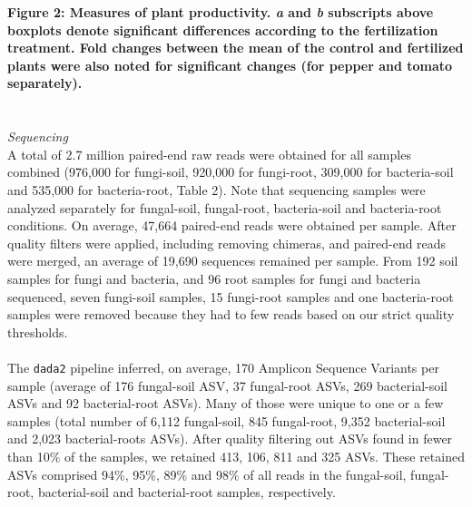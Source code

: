\documentclass[11pt,]{article}
\begin{document}
\textbf{Figure 2: Measures of plant productivity. \emph{a} and \emph{b}
subscripts above boxplots denote significant differences according to
the fertilization treatment. Fold changes between the mean of the
control and fertilized plants were also noted for significant changes
(for pepper and tomato separately).}\\
\hspace*{0.333em}\\
\hspace*{0.333em}\\
\emph{Sequencing}\\
A total of 2.7 million paired-end raw reads were obtained for all
samples combined (976,000 for fungi-soil, 920,000 for fungi-root,
309,000 for bacteria-soil and 535,000 for bacteria-root, Table 2). Note
that sequencing samples were analyzed separately for fungal-soil,
fungal-root, bacteria-soil and bacteria-root conditions. On average,
47,664 paired-end reads were obtained per sample. After quality filters
were applied, including removing chimeras, and paired-end reads were
merged, an average of 19,690 sequences remained per sample. From 192
soil samples for fungi and bacteria, and 96 root samples for fungi and
bacteria sequenced, seven fungi-soil samples, 15 fungi-root samples and
one bacteria-root samples were removed because they had to few reads
based on our strict quality thresholds.\\
\hspace*{0.333em}\\
The \texttt{dada2} pipeline inferred, on average, 170 Amplicon Sequence
Variants per sample (average of 176 fungal-soil ASV, 37 fungal-root
ASVs, 269 bacterial-soil ASVs and 92 bacterial-root ASVs). Many of those
were unique to one or a few samples (total number of 6,112 fungal-soil,
845 fungal-root, 9,352 bacterial-soil and 2,023 bacterial-roots ASVs).
After quality filtering out ASVs found in fewer than 10\% of the
samples, we retained 413, 106, 811 and 325 ASVs. These retained ASVs
comprised 94\%, 95\%, 89\% and 98\% of all reads in the fungal-soil,
fungal-root, bacterial-soil and bacterial-root samples, respectively.\\
\hspace*{0.333em}\\
\hspace*{0.333em}
\end{document}
